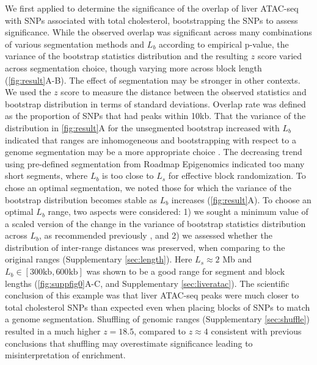 We first applied \bootranges to determine the significance of the
overlap of liver ATAC-seq
\citep{CURRIN20211169} with SNPs associated with total cholesterol,
bootstrapping the SNPs to assess significance.
While the observed overlap was significant across many combinations of
various segmentation methods and $L_b$ according to empirical p-value, 
the variance of the bootstrap statistics distribution 
and the resulting $z$ score varied across 
segmentation choice, though varying more across block length 
(\cref{fig:result}A-B). The effect of segmentation may be stronger 
in other contexts.
We used the $z$ score to measure the distance between the observed
statistics and bootstrap distribution in terms of standard deviations.
Overlap rate was defined as the proportion of
SNPs that had peaks within 10kb.
That the variance of the distribution in \cref{fig:result}A for the
unsegmented bootstrap increased with $L_b$ indicated that
ranges are inhomogeneous and
bootstrapping with respect to a genome
segmentation may be a more appropriate choice
\citep{bickel2010subsampling}. 
The decreasing trend using pre-defined segmentation from
Roadmap Epigenomics indicated too many short segments,
where $L_b$ is too close to $L_s$ for effective block randomization.
To chose an optimal segmentation, 
we noted those for which the variance of the bootstrap distribution 
becomes stable as $L_b$ increases (\cref{fig:result}A).
To choose an optimal $L_b$ range, two aspects were considered:
1) we sought a minimum value of a scaled version of the change 
in the variance of bootstrap statistics distribution across $L_b$, 
as recommended previously \citep{bickel2010subsampling},
and 2) we assessed whether the distribution of inter-range distances  
was preserved, when comparing to the original ranges 
(Supplementary \cref{sec:length}).
Here $L_s \approx 2$ Mb and $L_b \in [300\textrm{kb},600\textrm{kb}]$ was 
shown to be a good range for segment and block
lengths (\cref{fig:suppfig0}A-C, and Supplementary \cref{sec:liveratac}).
The scientific conclusion of this example was that liver ATAC-seq
peaks were
much closer to total cholesterol SNPs than expected even when placing
blocks of SNPs to match a genome segmentation. 
Shuffling of genomic ranges (Supplementary \cref{sec:shuffle})
resulted in a much higher $z = 18.5$, compared to $z \approx 4$ 
consistent with previous conclusions that shuffling may 
overestimate significance leading to misinterpretation of enrichment.

